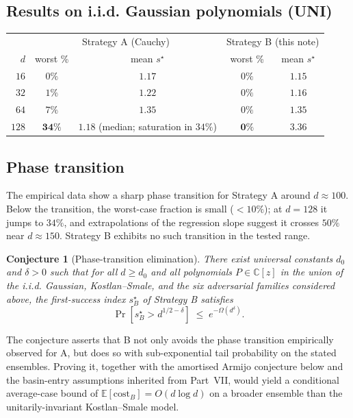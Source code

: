 \documentclass[11pt,a4paper]{article}
\newtheorem{conjecture}[theorem]{Conjecture}
\begin{document}
\subsection{Results on i.i.d. Gaussian polynomials (UNI)}

\begin{center}
\begin{tabular}{r|cc|cc}
\toprule
& \multicolumn{2}{c|}{Strategy A (Cauchy)} & \multicolumn{2}{c}{Strategy B (this note)} \\
$d$ & worst \% & mean $s^\star$ & worst \% & mean $s^\star$ \\
\midrule
$16$  & $0\%$    & $1.17$ & $0\%$  & $1.15$ \\
$32$  & $1\%$    & $1.22$ & $0\%$  & $1.16$ \\
$64$  & $7\%$    & $1.35$ & $0\%$  & $1.35$ \\
$128$ & $\mathbf{34\%}$ & $\mathbf{1.18}$ (median; saturation in $34\%$) & $\mathbf{0\%}$ & $3.36$ \\
\bottomrule
\end{tabular}
\end{center}

\subsection{Phase transition}

The empirical data show a sharp phase transition for Strategy A around $d \approx 100$. Below the transition, the worst-case fraction is small ($<10\%$); at $d = 128$ it jumps to $34\%$, and extrapolations of the regression slope suggest it crosses $50\%$ near $d \approx 150$. Strategy B exhibits no such transition in the tested range.

\begin{conjecture}[Phase-transition elimination]\label{conj:phase}
There exist universal constants $d_0$ and $\delta > 0$ such that for all $d \ge d_0$ and all polynomials $P \in \mathbb{C}[z]$ in the union of the i.i.d. Gaussian, Kostlan--Smale, and the six adversarial families considered above, the first-success index $s^\star_B$ of Strategy B satisfies
$$ \Pr[s^\star_B > d^{1/2 - \delta}] \;\le\; e^{-\Omega(d^\delta)}. $$
\end{conjecture}

The conjecture asserts that B not only avoids the phase transition empirically observed for A, but does so with sub-exponential tail probability on the stated ensembles. Proving it, together with the amortised Armijo conjecture below and the basin-entry assumptions inherited from Part~VII, would yield a conditional average-case bound of $\mathbb{E}[\mathrm{cost}_B] = O(d \log d)$ on a broader ensemble than the unitarily-invariant Kostlan--Smale model.
\end{document}

